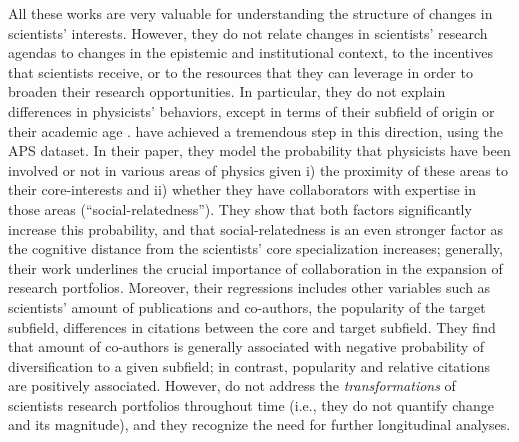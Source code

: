 \documentclass{article}
\begin{document}
All these works are very valuable for understanding the structure of changes in scientists' interests. %
However, they do not relate changes in scientists' research agendas to changes in the epistemic and institutional context, to the incentives that scientists receive, or to the resources that they can leverage in order to broaden their research opportunities. In particular, they do not explain differences in physicists' behaviors, except in terms of their subfield of origin or their academic age \citep{Zeng2019,Aleta2019}. \citet{Tripodi2020} have achieved a tremendous step in this direction, using the APS dataset. In their paper, they model the probability that physicists have been involved or not in various areas of physics given i) the proximity of these areas to their core-interests and ii) whether they have collaborators with expertise in those areas (``social-relatedness''). They show that both factors significantly increase this probability, and that social-relatedness is an even stronger factor as the cognitive distance from the scientists' core specialization increases; generally, their work underlines the crucial importance of collaboration in the expansion of research portfolios. Moreover, their regressions includes other variables such as scientists' amount of publications and co-authors, the popularity of the target subfield, differences in citations between the core and target subfield. They find that amount of co-authors is generally associated with negative probability of diversification to a given subfield; in contrast, popularity and relative citations are positively associated. However, \citeauthor{Tripodi2020} do not address the \textit{transformations} of scientists research portfolios throughout time (i.e., they do not quantify change and its magnitude), and they recognize the need for further longitudinal analyses.
\end{document}
